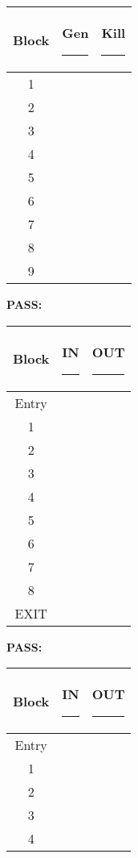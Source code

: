 \documentclass[12pt]{article}
\begin{document}
\begin{enumerate}
\begin{center}
\renewcommand{\arraystretch}{1.8}
  \begin{tabular}{|c|c|c|}
    \hline
    {\bf Block} & {\bf Gen}\rule{5cm}{0pt} & {\bf
      Kill}\rule{5cm}{0pt} \\ \hline \hline
    1 & & \\ \hline
    2 & & \\ \hline
    3 & & \\ \hline
    4 & & \\ \hline
    5 & & \\ \hline
    6 & & \\ \hline
    7 & & \\ \hline
    8 & & \\ \hline
    9 & & \\ \hline
  \end{tabular}
\end{center}
\clearpage
{\bf PASS: }
\begin{center}
\renewcommand{\arraystretch}{1.8}
  \begin{tabular}{|c|c|c|}
    \hline
    {\bf Block} & {\bf IN }\rule{5cm}{0pt} & {\bf
      OUT }\rule{5cm}{0pt} \\ \hline \hline
    Entry & & \\ \hline
    1 & & \\ \hline
    2 & & \\ \hline
    3 & & \\ \hline
    4 & & \\ \hline
    5 & & \\ \hline
    6 & & \\ \hline
    7 & & \\ \hline
    8 & & \\ \hline
    EXIT & & \\ \hline
  \end{tabular}
\end{center}
{\bf PASS: }
\begin{center}
\renewcommand{\arraystretch}{1.8}
  \begin{tabular}{|c|c|c|}
    \hline
    {\bf Block} & {\bf IN }\rule{5cm}{0pt} & {\bf
      OUT }\rule{5cm}{0pt} \\ \hline \hline
    Entry & & \\ \hline
    1 & & \\ \hline
    2 & & \\ \hline
    3 & & \\ \hline
    4 & & \\ \hline

\end{tabular}
\end{center}
\end{enumerate}
\end{document}

